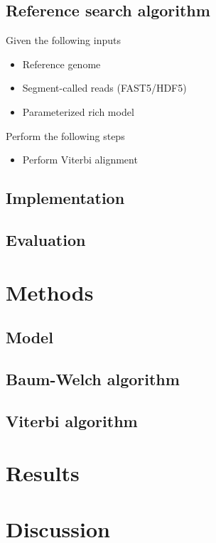 \documentclass[10pt]{article}
\begin{document}
\subsection{Reference search algorithm}

Given the following inputs
\begin{itemize}
\item Reference genome
\item Segment-called reads (FAST5/HDF5)
\item Parameterized rich model
\end{itemize}

Perform the following steps
\begin{itemize}
\item Perform Viterbi alignment
\end{itemize}

\subsection{Implementation}

\subsection{Evaluation}

\section{Methods}

\subsection{Model}

\subsection{Baum-Welch algorithm}

\subsection{Viterbi algorithm}


\newpage
\section{Results}




\section{Discussion}
\end{document}
